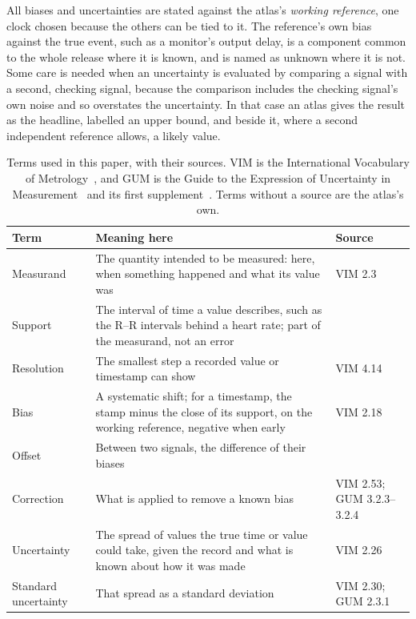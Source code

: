 \documentclass[11pt,a4paper]{article}
\begin{document}
All biases and uncertainties are stated against the atlas's \emph{working reference}, one clock chosen because the
others can be tied to it. The reference's own bias against the true event, such as a monitor's output delay, is a
component common to the whole release where it is known, and is named as unknown where it is not. Some care is needed
when an uncertainty is evaluated by comparing a signal with a second, checking signal, because the comparison includes
the checking signal's own noise and so overstates the uncertainty. In that case an atlas gives the result as the
headline, labelled an upper bound, and beside it, where a second independent reference allows, a likely value.

\begin{table}[tp]
  \centering
  \small
  \caption{Terms used in this paper, with their sources. VIM is the International Vocabulary of
    Metrology~\citep{jcgm-200-2012}, and GUM is the Guide to the Expression of Uncertainty in
    Measurement~\citep{jcgm-100-2008} and its first supplement~\citep{jcgm-101-2008}. Terms without a source are the
    atlas's own.}
  \label{tab:terms}
  \begin{tabularx}{\textwidth}{@{}P{0.2\textwidth}LP{0.2\textwidth}@{}}
  \toprule
  Term & Meaning here & Source \\
  \midrule
  Measurand & The quantity intended to be measured: here, when something happened and what its value was & VIM 2.3 \\
  Support & The interval of time a value describes, such as the R--R intervals behind a heart rate; part of the
    measurand, not an error & \citet{gotway2002combining} \\
  Resolution & The smallest step a recorded value or timestamp can show & VIM 4.14 \\
  Bias & A systematic shift; for a timestamp, the stamp minus the close of its support, on the working reference,
    negative when early & VIM 2.18 \\
  Offset & Between two signals, the difference of their biases & \\
  Correction & What is applied to remove a known bias & VIM 2.53; GUM 3.2.3--3.2.4 \\
  Uncertainty & The spread of values the true time or value could take, given the record and what is known about
    how it was made & VIM 2.26 \\
  Standard uncertainty & That spread as a standard deviation & VIM 2.30; GUM 2.3.1 \\

\end{tabularx}
\end{table}
\end{document}
